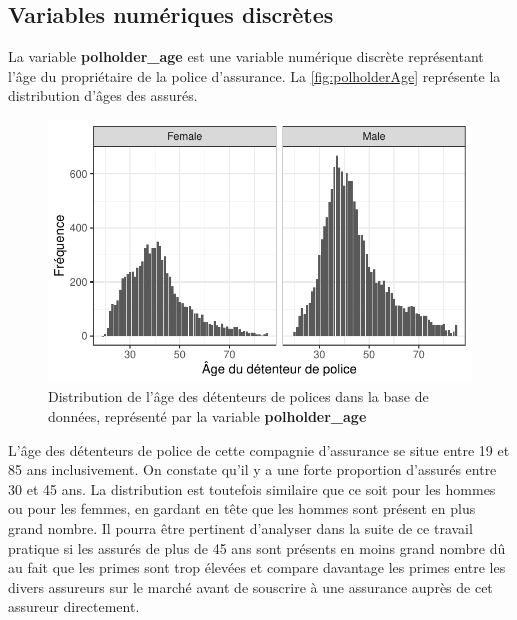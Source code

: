 \documentclass[
]{article}
\begin{document}
\newpage

\hypertarget{variables-numuxe9riques-discruxe8tes}{%
\subsection{Variables numériques
discrètes}\label{variables-numuxe9riques-discruxe8tes}}

La variable \textbf{polholder\_age} est une variable numérique discrète
représentant l'âge du propriétaire de la police d'assurance. La
\autoref{fig:polholderAge} représente la distribution d'âges des
assurés.

\begin{figure}

{\centering \includegraphics{01-Rapport_files/figure-latex/graph_polholder_age-1} 

}

\caption{\label{fig:polholderAge}Distribution de l'âge des détenteurs de polices dans la base de données, représenté par la variable \textbf{polholder\_age}}\label{fig:graph_polholder_age}
\end{figure}

L'âge des détenteurs de police de cette compagnie d'assurance se situe
entre 19 et 85 ans inclusivement. On constate qu'il y a une forte
proportion d'assurés entre 30 et 45 ans. La distribution est toutefois
similaire que ce soit pour les hommes ou pour les femmes, en gardant en
tête que les hommes sont présent en plus grand nombre. Il pourra être
pertinent d'analyser dans la suite de ce travail pratique si les assurés
de plus de 45 ans sont présents en moins grand nombre dû au fait que les
primes sont trop élevées et compare davantage les primes entre les
divers assureurs sur le marché avant de souscrire à une assurance auprès
de cet assureur directement.
\end{document}
